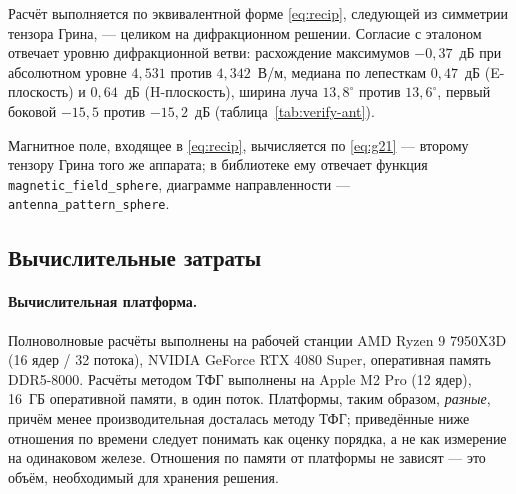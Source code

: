 \documentclass[11pt,a4paper]{article}
\begin{document}
Расчёт выполняется по эквивалентной форме \eqref{eq:recip}, следующей из симметрии
тензора Грина, --- целиком на дифракционном решении. Согласие с эталоном отвечает
уровню дифракционной ветви: расхождение максимумов $-0{,}37$~дБ при абсолютном
уровне $4{,}531$ против $4{,}342$~В/м, медиана по лепесткам $0{,}47$~дБ
(E-плоскость) и $0{,}64$~дБ (H-плоскость), ширина луча $13{,}8^\circ$ против
$13{,}6^\circ$, первый боковой $-15{,}5$ против $-15{,}2$~дБ
(таблица~\ref{tab:verify-ant}).

Магнитное поле, входящее в \eqref{eq:recip}, вычисляется по \eqref{eq:g21} ---
второму тензору Грина того же аппарата; в библиотеке ему отвечает функция
\texttt{magnetic\_field\_sphere}, диаграмме направленности ---
\texttt{antenna\_pattern\_sphere}.

\subsection{Вычислительные затраты}
\label{sec:cost}

\paragraph{Вычислительная платформа.}
Полноволновые расчёты выполнены на рабочей станции AMD Ryzen 9 7950X3D
(16 ядер / 32 потока), NVIDIA GeForce RTX 4080 Super, оперативная память
DDR5-8000. Расчёты методом ТФГ выполнены на Apple M2 Pro (12 ядер), 16~ГБ
оперативной памяти, в один поток. Платформы, таким образом, \emph{разные}, причём
менее производительная досталась методу ТФГ; приведённые ниже отношения по времени
следует понимать как оценку порядка, а не как измерение на одинаковом железе.
Отношения по памяти от платформы не зависят --- это объём, необходимый для
хранения решения.
\end{document}
